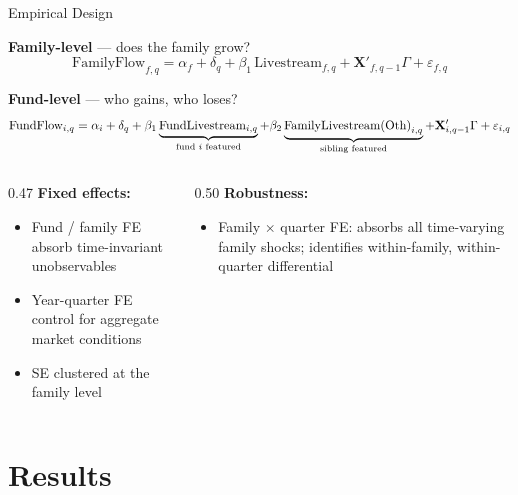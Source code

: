 \documentclass[11pt, aspectratio=169]{beamer}
\begin{document}

\begin{frame}{Empirical Design}

\textbf{Family-level} --- does the family grow?
\[
\text{FamilyFlow}_{f,q} = \alpha_f + \delta_q
  + \beta_1\,\text{Livestream}_{f,q}
  + \mathbf{X}'_{f,q-1}\Gamma + \varepsilon_{f,q}
\]

\smallskip
\textbf{Fund-level} --- who gains, who loses?
\[
\text{FundFlow}_{i,q} = \alpha_i + \delta_q
  + \beta_1\underbrace{\vphantom{X}\text{FundLivestream}_{i,q}}_{\text{fund $i$ featured}}
  + \beta_2\underbrace{\vphantom{X}\text{FamilyLivestream(Oth)}_{i,q}}_{\text{sibling featured}}
  + \mathbf{X}'_{i,q-1}\Gamma + \varepsilon_{i,q}
\]

\vspace{0.2cm}
\begin{columns}[T]
\begin{column}{0.47\textwidth}
\textbf{Fixed effects:}
\begin{itemize}
  \item Fund / family FE absorb time-invariant unobservables
  \item Year-quarter FE control for aggregate market conditions
  \item SE clustered at the family level
\end{itemize}
\end{column}
\begin{column}{0.50\textwidth}
\textbf{Robustness:}
\begin{itemize}
  \item Family $\times$ quarter FE: absorbs all time-varying
  family shocks; identifies within-family, within-quarter
  differential
\end{itemize}
\end{column}
\end{columns}

\end{frame}

\section{Results}
\end{document}
